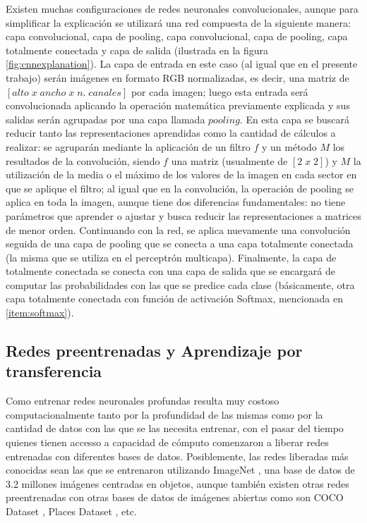 Existen muchas configuraciones de redes neuronales convolucionales, aunque para simplificar la explicación se utilizará una red compuesta de la siguiente manera: capa convolucional, capa de pooling, capa convolucional, capa de pooling, capa totalmente conectada y capa de salida (ilustrada en la figura \ref{fig:cnnexplanation}). La capa de entrada en este caso (al igual que en el presente trabajo) serán imágenes en formato RGB normalizadas, es decir, una matriz de \([alto \; x \;ancho \;x \;n. \;canales]\) por cada imagen; luego esta entrada será convolucionada aplicando la operación matemática previamente explicada y sus salidas serán agrupadas por una capa llamada \(pooling\). En esta capa se buscará reducir tanto las representaciones aprendidas como la cantidad de cálculos a realizar: se agruparán mediante la aplicación de un filtro \(f\) y un método \(M\) los resultados de la convolución, siendo \(f\) una matriz (usualmente de \([2\;x\; 2]\)) y \(M\) la utilización de la media o el máximo de los valores de la imagen en cada sector en que se aplique el filtro; al igual que en la convolución, la operación de pooling se aplica en toda la imagen, aunque tiene dos diferencias fundamentales: no tiene parámetros que aprender o ajustar y busca reducir las representaciones a matrices de menor orden. Continuando con la red, se aplica nuevamente una convolución seguida de una capa de pooling que se conecta a una capa totalmente conectada (la misma que se utiliza en el perceptrón multicapa). 
Finalmente, la capa de totalmente conectada se conecta con una capa de salida que se encargará de computar las probabilidades con las que se predice cada clase (básicamente, otra capa totalmente conectada con función de activación Softmax, mencionada en \ref{item:softmax}).

\subsection{Redes preentrenadas y Aprendizaje por transferencia} 

Como entrenar redes neuronales profundas resulta muy costoso computacionalmente tanto por la profundidad de las mismas como por la cantidad de datos con las que se las necesita entrenar, con el pasar del tiempo quienes tienen accesso a capacidad de cómputo comenzaron a liberar redes entrenadas con diferentes bases de datos. Posiblemente, las redes liberadas más conocidas sean las que se entrenaron utilizando ImageNet \cite{ImageNet}, una base de datos de 3.2 millones imágenes centradas en objetos, aunque también existen otras redes preentrenadas con otras bases de datos de imágenes abiertas como son COCO Dataset \cite{BMVC2015_52}, Places Dataset \cite{learning_deep_features}, etc.


